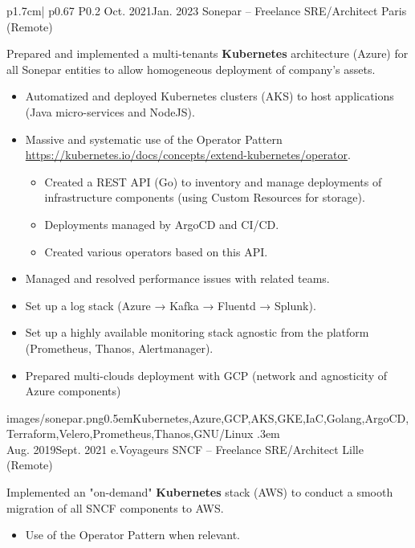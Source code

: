 \begin{longtable}{p{1.7cm}| p{} P{0.2\textwidth}}
  \cveventdetailed
    {Oct. 2021\newline Jan. 2023}
    {Sonepar -- Freelance}
    {SRE/Architect}
    {Paris (Remote)\color{cvred}}
    {
      Prepared and implemented a multi-tenants {\bfseries Kubernetes} architecture (Azure) for all Sonepar entities to allow homogeneous deployment of company's assets.
      \begin{itemize}
        \item Automatized and deployed Kubernetes clusters (AKS) to host applications (Java micro-services and NodeJS).
        \item Massive and systematic use of the Operator Pattern \url{https://kubernetes.io/docs/concepts/extend-kubernetes/operator}.
        \begin{itemize}
          \item Created a REST API (Go) to inventory and manage deployments of infrastructure components (using Custom Resources for storage).
          \item Deployments managed by ArgoCD and CI/CD.
          \item Created various operators based on this API.
        \end{itemize}
        \item Managed and resolved performance issues with related teams.
        \item Set up a log stack (Azure → Kafka → Fluentd → Splunk).
        \item Set up a highly available monitoring stack agnostic from the platform (Prometheus, Thanos, Alertmanager).
        \item Prepared multi-clouds deployment with GCP (network and agnosticity of Azure components)
      \end{itemize}
    }
    {images/sonepar.png}{0.5em}{Kubernetes,Azure,GCP,AKS,GKE,IaC,Golang,ArgoCD,Terraform,Velero,Prometheus,Thanos,GNU/Linux}
    {.3em} \\
  \cveventdetailed
    {Aug. 2019\newline Sept. 2021}
    {e.Voyageurs SNCF -- Freelance}
    {SRE/Architect}
    {Lille (Remote)\color{cvred}}
    {
      Implemented an "on-demand" {\bfseries Kubernetes} stack (AWS) to conduct a smooth migration of all SNCF components to AWS.
      \begin{itemize}
        \item Use of the Operator Pattern when relevant.

\end{itemize}}
\end{longtable}
